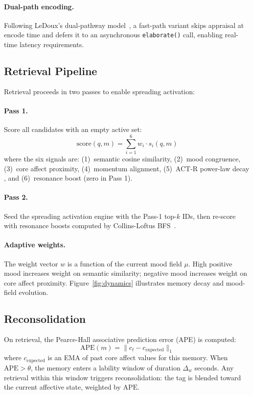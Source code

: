 \documentclass[11pt]{article}
\begin{document}
\paragraph{Dual-path encoding.} Following LeDoux's dual-pathway
model~\citep{ledoux1996emotional}, a fast-path variant skips appraisal at encode
time and defers it to an asynchronous \texttt{elaborate()} call, enabling
real-time latency requirements.

\subsection{Retrieval Pipeline}
\label{sec:retrieval}

Retrieval proceeds in two passes to enable spreading activation:

\paragraph{Pass 1.} Score all candidates with an empty active set:
\[
  \text{score}(q, m) = \sum_{i=1}^{6} w_i \cdot s_i(q, m)
\]
where the six signals are: (1)~semantic cosine similarity, (2)~mood congruence,
(3)~core affect proximity, (4)~momentum alignment, (5)~ACT-R power-law decay
\citep{anderson1983actr}, and (6)~resonance boost (zero in Pass 1).

\paragraph{Pass 2.} Seed the spreading activation engine with the Pass-1 top-$k$
IDs, then re-score with resonance boosts computed by
Collins-Loftus BFS~\citep{collins1975spreading}.

\paragraph{Adaptive weights.} The weight vector $w$ is a function of the current
mood field $\mu$. High positive mood increases weight on semantic similarity;
negative mood increases weight on core affect proximity.
Figure~\ref{fig:dynamics} illustrates memory decay and mood-field evolution.

\subsection{Reconsolidation}
\label{sec:reconsolidation}

On retrieval, the Pearce-Hall associative prediction error (APE) is computed:
\[
  \text{APE}(m) = \|c_t - c_{\text{expected}}\|_1
\]
where $c_{\text{expected}}$ is an EMA of past core affect values for this memory.
When $\text{APE} > \theta$, the memory enters a lability window of duration
$\Delta_w$ seconds. Any retrieval within this window triggers reconsolidation:
the tag is blended toward the current affective state, weighted by $\text{APE}$.
\end{document}
